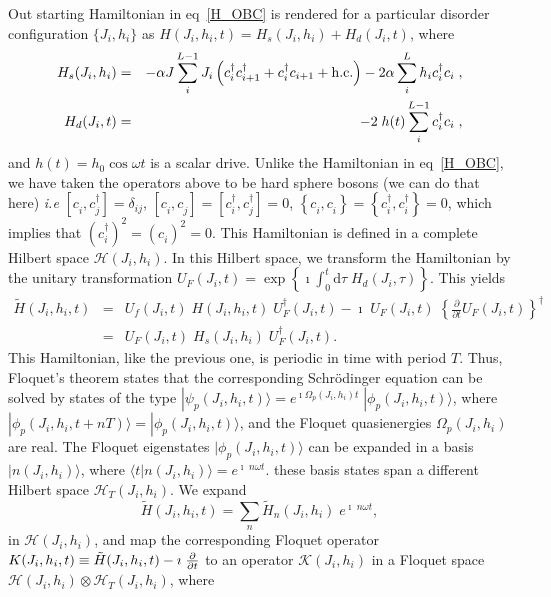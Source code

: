 \documentclass[a4paper,10pt]{article}
\begin{document}
Out starting Hamiltonian in eq~\ref{H_OBC} is rendered for a particular disorder configuration $\{J_i,h_i\}$ as
$H(J_i,h_i,t) = H_s(J_i,h_i) + H_d(J_i,t)$, where
\begin{eqnarray} 
\label{eq:hshd}
H_s(J_i,h_i) &=& - \alpha J \sum_i^{L-1} J_i \left(c^{\dagger}_i c^{\dagger}_{i+1} + c^{\dagger}_i c_{i+1}  + {\rm h.c.}\right) 
    - 2 \alpha \sum_i^{L}  h_i c^{\dagger}_i c_i \; ,\nonumber \\
 H_d(J_i,t) &=& -2\; h(t)\sum_i^{L-1} c^{\dagger}_i c_i \; ,
\end{eqnarray}
and $h(t)=h_0\cos{\omega t}$ is a scalar drive. Unlike the Hamiltonian in eq~\ref{H_OBC}, we have taken the operators above to be hard sphere bosons (we can do that here) \textit{i.e} $\left[c^{\;}_i,c^\dagger_j\right]=\delta_{ij}$, $\left[c^{\;}_i,c^{\;}_j\right]=\left[c^{\dagger}_i,c^\dagger_j\right]=0$, $\left\{c^{\;}_i,c^{\;}_i\right\}=\left\{c^{\dagger}_i,c^{\dagger}_i\right\}=0$, which implies that $\left(c^\dagger_i\right)^2=\left(c^{\;}_i\right)^2=0$. This Hamiltonian is defined in a complete Hilbert space $\mathcal{H}(J_i,h_i)$. In this Hilbert space, we transform the Hamiltonian by the unitary transformation $U_F(J_i,t) = \exp{\left\{\imath \int^t_0 \mathrm{d}\tau \; H_d(J_i,\tau)\right\}}$. This yields
\begin{eqnarray}
 \label{eq:htilde}
 \tilde{H}(J_i,h_i,t) &=& U_f(J_i,t)\; H(J_i,h_i,t)\; U^\dagger_F(J_i,t) - \imath \; U_F(J_i,t)\; \left\{\frac{\partial}{\partial t} U_F(J_i,t)\right\}^\dagger \nonumber \\
              &=& U_F(J_i,t)\; H_s(J_i,h_i)\; U^\dagger_F(J_i,t).
\end{eqnarray}
This Hamiltonian, like the previous one, is periodic in time with period $T$. Thus, Floquet's theorem states that the corresponding Schr\"odinger equation can be solved by states of the type $|\psi_p (J_i,h_i,t) \rangle = e^{\imath \Omega_p(J_i,h_i) t}\; |\phi_p(J_i,h_i,t)\rangle$, where $|\phi_p(J_i,h_i,t+nT)\rangle=|\phi_p(J_i,h_i,t)\rangle$, and the Floquet quasienergies $\Omega_p(J_i,h_i)$ are real. The Floquet eigenstates $|\phi_p(J_i,h_i,t)\rangle$ can be expanded in a basis $|n(J_i,h_i)\rangle$, where $\langle t |n(J_i,h_i)\rangle = e^{\imath \; n\omega t}$. these basis states span a different Hilbert space $\mathcal{H}_T(J_i,h_i)$. We expand
\begin{equation}
\label{eq:fourier}
\tilde{H}(J_i,h_i,t) = \sum_n \tilde{H}_n(J_i,h_i)\; e^{\imath \; n\omega t},
\end{equation}
in $\mathcal{H}(J_i,h_i)$, and map the corresponding Floquet operator $K(J_i,h_i,t)\equiv \tilde{H}(J_i,h_i,t)-\imath \; {\partial\over\partial t} $ to an operator $\mathcal{K}(J_i,h_i)$ in a Floquet space $\mathcal{H}(J_i,h_i)\otimes\mathcal{H}_T(J_i,h_i)$, where
\end{document}
